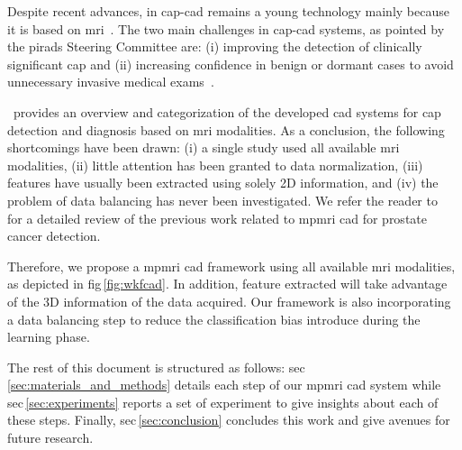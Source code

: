 \documentclass[a4paper,num-refs]{wiley-article}
\begin{document}
Despite recent advances, in \ac{cap}-\ac{cad} remains a young technology mainly
because it is based on \ac{mri}~\cite{Hegde2013}. The two main challenges in
\ac{cap}-\ac{cad} systems, as pointed by the \ac{pirads} Steering Committee
are: (i) improving the detection of clinically significant \ac{cap} and (ii)
increasing confidence in benign or dormant cases to avoid unnecessary invasive
medical exams~\citep{weinreb2016pi}.


\citeauthor{lemaitre2015computer}\,\cite{lemaitre2015computer} provides an
overview and categorization of the developed \acs{cad} systems for \ac{cap}
detection and diagnosis based on \ac{mri} modalities. As a conclusion, the
following shortcomings have been drawn: (i) a single study used all available
\ac{mri} modalities, (ii) little attention has been granted to data
normalization, (iii) features have usually been extracted using solely 2D
information, and (iv) the problem of data balancing has never been
investigated. We refer the reader to~\cite{lemaitre2015computer} for a detailed
review of the previous work related to \ac{mpmri} \ac{cad} for prostate cancer
detection.

Therefore, we propose a \ac{mpmri} \ac{cad} framework using all available
\ac{mri} modalities, as depicted in \acs{fig}\,\ref{fig:wkfcad}. In addition,
feature extracted will take advantage of the 3D information of the data
acquired. Our framework is also incorporating a data balancing step to reduce
the classification bias introduce during the learning phase.


The rest of this document is structured as follows:
\acs{sec}\,\ref{sec:materials_and_methods} details each step of our \ac{mpmri}
\ac{cad} system while \acs{sec}\,\ref{sec:experiments} reports a set of
experiment to give insights about each of these steps. Finally,
\ac{sec}\,\ref{sec:conclusion} concludes this work and give avenues for future
research.
\end{document}
